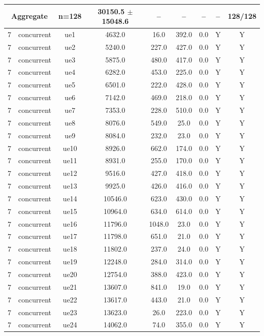 \begin{table}[ht]
\begin{tabular}{|c|c|c|c|c|c|c|c|c|}
\multicolumn{2}{|c|}{\textbf{Aggregate}} & n=128 & 30150.5 $\pm$ 15048.6 & -- & -- & -- & -- & 128/128 \\
\hline
7 & concurrent & ue1 & 4632.0 & 16.0 & 392.0 & 0.0 & Y & Y \\
7 & concurrent & ue2 & 5240.0 & 227.0 & 427.0 & 0.0 & Y & Y \\
7 & concurrent & ue3 & 5875.0 & 480.0 & 417.0 & 0.0 & Y & Y \\
7 & concurrent & ue4 & 6282.0 & 453.0 & 225.0 & 0.0 & Y & Y \\
7 & concurrent & ue5 & 6501.0 & 222.0 & 428.0 & 0.0 & Y & Y \\
7 & concurrent & ue6 & 7142.0 & 469.0 & 218.0 & 0.0 & Y & Y \\
7 & concurrent & ue7 & 7353.0 & 228.0 & 510.0 & 0.0 & Y & Y \\
7 & concurrent & ue8 & 8076.0 & 549.0 & 25.0 & 0.0 & Y & Y \\
7 & concurrent & ue9 & 8084.0 & 232.0 & 23.0 & 0.0 & Y & Y \\
7 & concurrent & ue10 & 8926.0 & 662.0 & 174.0 & 0.0 & Y & Y \\
7 & concurrent & ue11 & 8931.0 & 255.0 & 170.0 & 0.0 & Y & Y \\
7 & concurrent & ue12 & 9516.0 & 427.0 & 418.0 & 0.0 & Y & Y \\
7 & concurrent & ue13 & 9925.0 & 426.0 & 416.0 & 0.0 & Y & Y \\
7 & concurrent & ue14 & 10546.0 & 623.0 & 430.0 & 0.0 & Y & Y \\
7 & concurrent & ue15 & 10964.0 & 634.0 & 614.0 & 0.0 & Y & Y \\
7 & concurrent & ue16 & 11796.0 & 1048.0 & 23.0 & 0.0 & Y & Y \\
7 & concurrent & ue17 & 11798.0 & 651.0 & 21.0 & 0.0 & Y & Y \\
7 & concurrent & ue18 & 11802.0 & 237.0 & 24.0 & 0.0 & Y & Y \\
7 & concurrent & ue19 & 12248.0 & 284.0 & 314.0 & 0.0 & Y & Y \\
7 & concurrent & ue20 & 12754.0 & 388.0 & 423.0 & 0.0 & Y & Y \\
7 & concurrent & ue21 & 13607.0 & 841.0 & 19.0 & 0.0 & Y & Y \\
7 & concurrent & ue22 & 13617.0 & 443.0 & 21.0 & 0.0 & Y & Y \\
7 & concurrent & ue23 & 13623.0 & 26.0 & 223.0 & 0.0 & Y & Y \\
7 & concurrent & ue24 & 14062.0 & 74.0 & 355.0 & 0.0 & Y & Y \\

\end{tabular}
\end{table}
